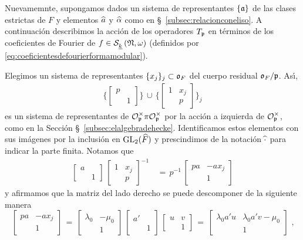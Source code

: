 Nuevamemnte, supongamos dados un sistema de representantes $\{\frak{a}\}$ de
las clases estrictas de $F$ y elementos $\hhat{a}$ y $\hhat{\alpha}$ como en
\S~\ref{subsec:relacionconeliso}. A continuaci\'{o}n describimos la
acci\'{o}n de los operadores $T_{\frak{p}}$ en t\'{e}rminos de los coeficientes
de Fourier de $f\in\spitzH{k}{\frak{N},\omega}$ (definidos por
\eqref{eq:coeficientesdefourierformamodular}).

Elegimos un sistema de representantes $\{x_{j}\}_{j}\subset\oka{F}$ del cuerpo
residual $\oka{F}/\frak{p}$. As\'{\i},
\begin{align*}
	\bigg\{\begin{bmatrix} p & \\ & 1 \end{bmatrix}\bigg\}\,\cup\,
		\bigg\{\begin{bmatrix} 1 & x_{j} \\ & p \end{bmatrix}
			\bigg\}_{j}
\end{align*}
%
es un sistema de representantes de
$\cal{O}_{\frak{p}}^{\times}\pi\cal{O}_{\frak{p}}^{\times}$ por la acci\'{o}n
a izquierda de $\cal{O}_{\frak{p}}^{\times}$, como en la Secci\'{o}n
\S~\ref{subsec:elalgebradehecke}. Identificamos estos elementos con sus
im\'{a}genes por la inclusi\'{o}n en $\GL_{2}(\Adfin{F})$ y prescindimos de la
notaci\'{o}n $\hhat{\cdot}$ para indicar la parte finita.
Notamos que
\begin{align*}
	\begin{bmatrix} a & \\ & 1 \end{bmatrix}\,
		\begin{bmatrix} 1 & x_{j} \\ & p \end{bmatrix}^{-1} & \,=\,
	p^{-1}\,\begin{bmatrix} pa & -ax_{j} \\ & 1 \end{bmatrix}
\end{align*}
%
y afirmamos que la matriz del lado derecho se puede descomponer de la siguiente
manera
\begin{equation}
	\label{eq:descomposicionfouriermatrices}
	\begin{bmatrix} pa & -ax_{j} \\ & 1 \end{bmatrix} \,=\,
		\begin{bmatrix} \lambda_{0} & -\mu_{0} \\ & 1 \end{bmatrix}\,
		\begin{bmatrix} a' & \\ & 1 \end{bmatrix}\,
		\begin{bmatrix} u & v \\ & 1 \end{bmatrix} \,=\,
			\begin{bmatrix}
				\lambda_{0}a'u & \lambda_{0}a'v-\mu_{0} \\ & 1
			\end{bmatrix}
	\text{ ,}
\end{equation}
